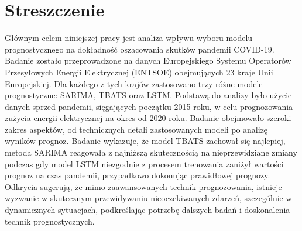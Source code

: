 \documentclass[polish, twoside, 12pt, a4paper]{article}
\theoremstyle{definition}
\theoremstyle{plain}
\theoremstyle{remark}
\begin{document}
\clearpage



\clearpage
{}
\listoftables

\clearpage
{}
\listoffigures



\clearpage
{}
\section*{Streszczenie}

Głównym celem niniejszej pracy jest analiza wpływu wyboru modelu prognostycznego na dokładność oszacowania skutków pandemii COVID-19. Badanie zostało przeprowadzone na danych Europejskiego Systemu Operatorów Przesyłowych Energii Elektrycznej (ENTSOE) obejmujących 23 kraje Unii Europejskiej. Dla każdego z tych krajów zastosowano trzy różne modele prognostyczne: SARIMA, TBATS oraz LSTM. Podstawą do analizy było użycie danych sprzed pandemii, sięgających początku 2015 roku, w celu prognozowania zużycia energii elektrycznej na okres od 2020 roku. Badanie obejmowało szeroki zakres aspektów, od technicznych detali zastosowanych modeli po analizę wyników prognoz. Badanie wykazuje, że model TBATS zachował się najlepiej, metoda SARIMA reagowała z najniższą skutecznością na nieprzewidziane zmiany podczas gdy model LSTM niezgodnie z procesem trenowania zaniżył wartości prognoz na czas pandemii, przypadkowo dokonując prawidłowej prognozy. Odkrycia sugerują, że mimo zaawansowanych technik prognozowania, istnieje wyzwanie w skutecznym przewidywaniu nieoczekiwanych zdarzeń, szczególnie w dynamicznych sytuacjach, podkreślając potrzebę dalszych badań i doskonalenia technik prognostycznych.
\end{document}
